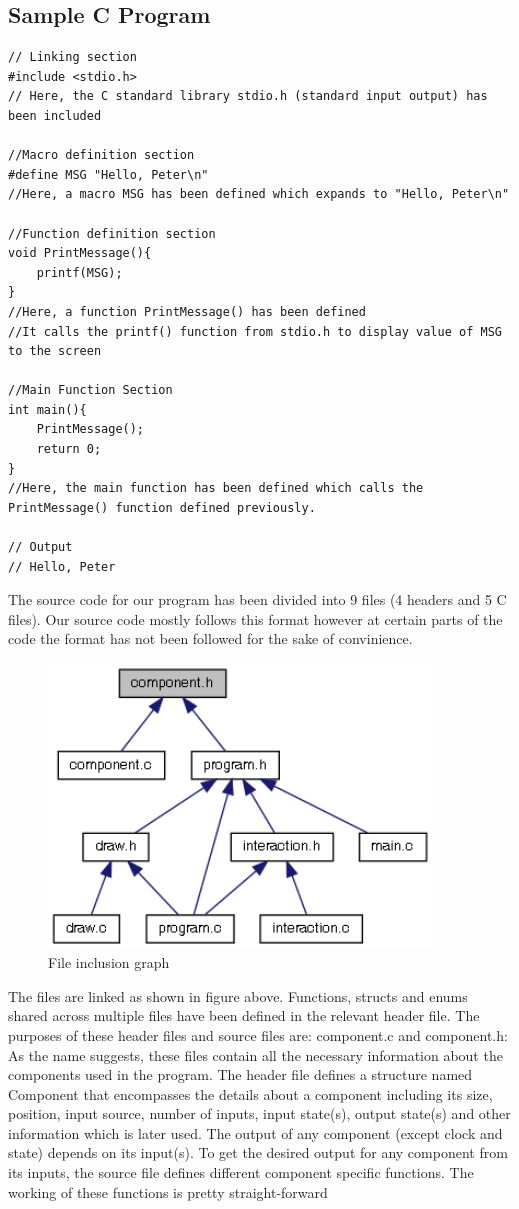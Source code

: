 \documentclass[report]{subfiles}
\begin{document}
    \subsection{Sample C Program}
\begin{lstlisting}
// Linking section
#include <stdio.h>
// Here, the C standard library stdio.h (standard input output) has been included

//Macro definition section
#define MSG "Hello, Peter\n"
//Here, a macro MSG has been defined which expands to "Hello, Peter\n"

//Function definition section
void PrintMessage(){
    printf(MSG);
}
//Here, a function PrintMessage() has been defined
//It calls the printf() function from stdio.h to display value of MSG to the screen

//Main Function Section
int main(){
    PrintMessage();
    return 0;
}
//Here, the main function has been defined which calls the PrintMessage() function defined previously.

// Output
// Hello, Peter
\end{lstlisting}
    The source code for our program has been divided into 9 files (4 headers and 5 C files). Our source code mostly follows this format however at certain parts of the code the format has not been followed for the sake of convinience.
    \begin{figure}[H]
        \centering
        \includegraphics[width=4in]{graphics/component_8h__dep__incl.png}
        \caption{File inclusion graph}
    \end{figure}
    The files are linked as shown in figure above. Functions, structs and enums shared across multiple files have been defined in the relevant header file. The purposes of these header files and source files are:
    component.c and component.h:
As the name suggests, these files contain all the necessary
information about the components used in the program. The header
file defines a structure named Component that encompasses the
details about a component including its size, position, input source,
number of inputs, input state(s), output state(s) and other
information which is later used.
The output of any component (except clock and state) depends on
its input(s). To get the desired output for any component from its
inputs, the source file defines different component specific
functions. The working of these functions is pretty straight-forward
\end{document}

